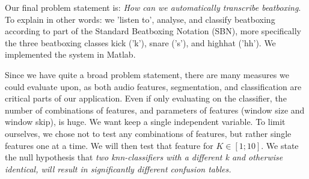 Our final problem statement is: \textit{How can we automatically transcribe beatboxing}. To explain in other words: we 'listen to', analyse, and classify beatboxing according to part of the Standard Beatboxing Notation (SBN), more specifically the three beatboxing classes kick ('k'), snare ('s'), and highhat ('hh'). We implemented the system in Matlab\sup{\textregistered}.


Since we have quite a broad problem statement, there are many measures we could evaluate upon, as both audio features, segmentation, and classification are critical parts of our application. Even if only evaluating on the classifier, the number of combinations of features, and parameters of features (window size and window skip), is huge. We want keep a single independent variable. To limit ourselves, we chose not to test any combinations of features, but rather single features one at a time. We will then test that feature for $K \in [1;10]$. We state the null hypothesis that \emph{two knn-classifiers with a different k and otherwise identical, will result in significantly different confusion tables.}

